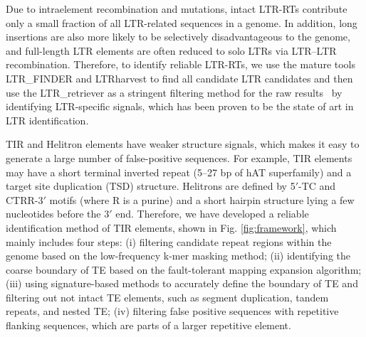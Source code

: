 \documentclass{bmcart}
\begin{document}
Due to intraelement recombination and mutations, intact LTR-RTs contribute only a small fraction of all LTR-related sequences in a genome\cite{ou2018ltr_retriever}. In addition, long insertions are also more likely to be selectively disadvantageous to the genome, and full-length LTR elements are often reduced to solo LTRs via LTR–LTR recombination\cite{storer2022methodologies}. Therefore, to identify reliable LTR-RTs, we use the mature tools LTR\_FINDER\cite{xu2007ltr_finder} and LTRharvest\cite{ellinghaus2008ltrharvest} to find all candidate LTR candidates and then use the LTR\_retriever\cite{ou2018ltr_retriever} as a stringent filtering method for the raw results  by identifying LTR-specific signals, which has been proven to be the state of art in LTR identification.

TIR and Helitron elements have weaker structure signals, which makes it easy to generate a large number of false-positive sequences. For example, TIR elements may have a short terminal inverted repeat (5–27 bp of hAT superfamily) and a target site duplication (TSD) structure. Helitrons are defined by 5$'$-TC and CTRR-3$'$ motifs (where R is a purine) and a short hairpin structure lying a few nucleotides before the 3$'$ end. Therefore, we have developed a reliable identification method of TIR elements, shown in Fig. \ref{fig:framework}, which mainly includes four steps: (i) filtering candidate repeat regions within the genome based on the low-frequency k-mer masking method; (ii) identifying the coarse boundary of TE based on the fault-tolerant mapping expansion algorithm; (iii) using signature-based methods to accurately define the boundary of TE and filtering out not intact TE elements, such as segment duplication, tandem repeats, and nested TE; (iv) filtering false positive sequences with repetitive flanking sequences, which are parts of a larger repetitive element.
\end{document}
